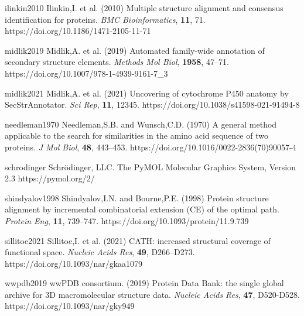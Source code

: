 
\myreference
{ilinkin2010}
{Ilinkin,I. et al. (2010) 
Multiple structure alignment and consensus identification for proteins. 
\emph{BMC Bioinformatics}, \textbf{11}, 71.}
{https://doi.org/10.1186/1471-2105-11-71}

\myreference
{midlik2019}
{Midlik,A. et al. (2019) 
Automated family-wide annotation of secondary structure elements. 
\emph{Methods Mol Biol}, \textbf{1958}, 47--71.}
{https://doi.org/10.1007/978-1-4939-9161-7_3}

\myreference
{midlik2021}
{Midlik,A. et al. (2021) 
Uncovering of cytochrome P450 anatomy by SecStrAnnotator. 
\emph{Sci Rep}, \textbf{11}, 12345.}
{https://doi.org/10.1038/s41598-021-91494-8}

\myreference
{needleman1970}
{Needleman,S.B. and Wunsch,C.D. (1970)
A general method applicable to the search for similarities in the amino acid sequence of two proteins.
\emph{J Mol Biol}, \textbf{48}, 443--453.}
{https://doi.org/10.1016/0022-2836(70)90057-4}

\myreference
{schrodinger}
{Schrödinger, LLC. The PyMOL Molecular Graphics System, Version 2.3}
{https://pymol.org/2/}

\myreference
{shindyalov1998}
{Shindyalov,I.N. and Bourne,P.E. (1998) 
Protein structure alignment by incremental combinatorial extension (CE) of the optimal path. 
\emph{Protein Eng}, \textbf{11}, 739--747.}
{https://doi.org/10.1093/protein/11.9.739}

\myreference
{sillitoe2021}
{Sillitoe,I. et al. (2021) 
CATH: increased structural coverage of functional space. 
\emph{Nucleic Acids Res}, \textbf{49}, D266--D273.}
{https://doi.org/10.1093/nar/gkaa1079}

\myreference
{wwpdb2019}
{wwPDB consortium. (2019) 
Protein Data Bank: the single global archive for 3D macromolecular structure data. 
\emph{Nucleic Acids Res}, \textbf{47}, D520-D528.}
{https://doi.org/10.1093/nar/gky949}

